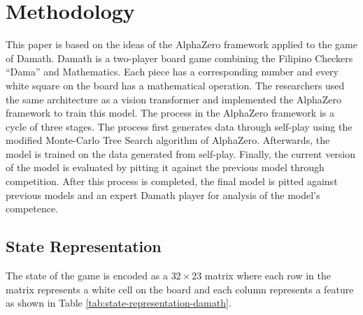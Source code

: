 \chapter{Methodology}

This paper is based on the ideas of the AlphaZero framework applied to the game of Damath. Damath is a two-player board game combining the Filipino Checkers ``Dama'' and Mathematics. Each piece has a corresponding number and every white square on the board has a mathematical operation. The researchers used the same architecture as a vision transformer and implemented the AlphaZero framework to train this model. The process in the AlphaZero framework is a cycle of three stages. The process first generates data through self-play using the modified Monte-Carlo Tree Search algorithm of AlphaZero. Afterwards, the model is trained on the data generated from self-play. Finally, the current version of the model is evaluated by pitting it against the previous model through competition.  After this process is completed, the final model is pitted against previous models and an expert Damath player for analysis of the model's competence.

\section{State Representation}
The state of the game is encoded as a $32 \times 23$ matrix where each row in the matrix represents a white cell on the board and each column represents a feature as shown in Table \ref{tab:state-representation-damath}. 


